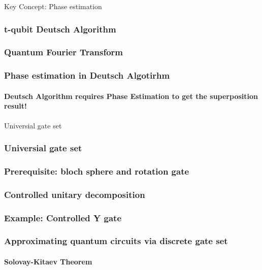 \documentclass[9pt]{beamer}
\begin{document}
    \begin{section}{Key Concept: Phase estimation}
        \begin{frame}
            \frametitle{t-qubit Deutsch Algorithm}

        \end{frame}

        \begin{frame}
            \frametitle{Quantum Fourier Transform}

        \end{frame}

        \begin{frame}
            \frametitle{Phase estimation in Deutsch Algotirhm}
            \framesubtitle{Deutsch Algorithm requires Phase Estimation to get the superposition result!}
            
        \end{frame}
    \end{section}

    \begin{section}{Universial gate set}
        \begin{frame}
            \frametitle{Universial gate set}
            
        \end{frame}

        \begin{frame}
            \frametitle{Prerequisite: bloch sphere and rotation gate}
            
        \end{frame}

        \begin{frame}
            \frametitle{Controlled unitary decomposition}
            
        \end{frame}

        \begin{frame}
            \frametitle{Example: Controlled Y gate}
            
        \end{frame}

        \begin{frame}
            \frametitle{Approximating quantum circuits via discrete gate set}
            \framesubtitle{Solovay-Kitaev Theorem}
            
        \end{frame}
    \end{section}
\end{document}
